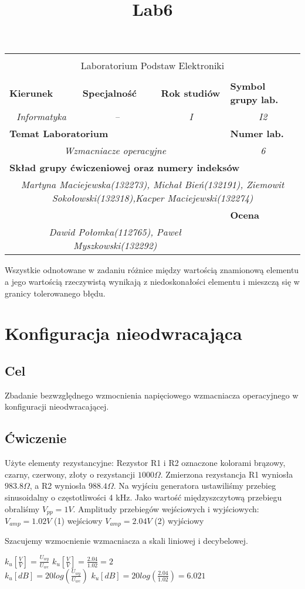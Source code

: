 \documentclass[polish,a4paper]{article}
\title{Lab6}
\newcommand{\PRzFieldDsc}[1]{\sffamily\bfseries\scriptsize #1}
\newcommand{\PRzFieldCnt}[1]{\textit{#1}}
\newcommand{\PRzHeading}[8]{
\begin{center}
\begin{tabular}{ p{0.32\textwidth} p{0.15\textwidth} p{0.15\textwidth} p{0.12\textwidth} p{0.12\textwidth} }

  &   &   &   &   \\
\hline
\multicolumn{5}{|c|}{}\\[-1ex]
\multicolumn{5}{|c|}{{\LARGE #1}}\\
\multicolumn{5}{|c|}{}\\[-1ex]

\hline
\multicolumn{1}{|l|}{\PRzFieldDsc{Kierunek}}	& \multicolumn{1}{|l|}{\PRzFieldDsc{Specjalność}}	& \multicolumn{1}{|l|}{\PRzFieldDsc{Rok studiów}}	& \multicolumn{2}{|l|}{\PRzFieldDsc{Symbol grupy lab.}} \\
\multicolumn{1}{|c|}{\PRzFieldCnt{#2}}		& \multicolumn{1}{|c|}{\PRzFieldCnt{#3}}		& \multicolumn{1}{|c|}{\PRzFieldCnt{#4}}		& \multicolumn{2}{|c|}{\PRzFieldCnt{#5}} \\

\hline
\multicolumn{4}{|l|}{\PRzFieldDsc{Temat Laboratorium}}		& \multicolumn{1}{|l|}{\PRzFieldDsc{Numer lab.}} \\
\multicolumn{4}{|c|}{\PRzFieldCnt{#6}}				& \multicolumn{1}{|c|}{\PRzFieldCnt{#7}} \\

\hline
\multicolumn{5}{|l|}{\PRzFieldDsc{Skład grupy ćwiczeniowej oraz numery indeksów}}\\
\multicolumn{5}{|c|}{\PRzFieldCnt{#8}}\\

\hline
\multicolumn{3}{|l|}{\PRzFieldDsc{}}	& \multicolumn{2}{|l|}{\PRzFieldDsc{Ocena}} \\
\multicolumn{3}{|c|}{\PRzFieldCnt{Dawid Połomka(112765), Paweł Myszkowski(132292) }}		& \multicolumn{2}{|c|}{\PRzFieldCnt{\ }} \\

\hline
\end{tabular}
\end{center}
}
\begin{document}
\PRzHeading{Laboratorium Podstaw Elektroniki}{Informatyka}{--}{I}{I2}{Wzmacniacze operacyjne}{6}{Martyna Maciejewska(132273), Michał Bień(132191), Ziemowit Sokołowski(132318),Kacper Maciejewski(132274)}{}

{\large Wszystkie odnotowane w zadaniu różnice między wartością znamionową elementu a jego wartością rzeczywistą wynikają z niedoskonałości elementu i mieszczą się w granicy tolerowanego błędu.}

\section{Konfiguracja nieodwracająca}

\subsection{Cel}
Zbadanie bezwzględnego wzmocnienia napięciowego wzmacniacza operacyjnego w konfiguracji nieodwracającej.

\subsection{Ćwiczenie}

Użyte elementy rezystancyjne: 
Rezystor R1 i R2 oznaczone kolorami brązowy, czarny, czerwony, złoty o rezystancji $1000\Omega$. Zmierzona rezystancja R1 wyniosła $983.8\Omega$, a R2 wyniosła $988.4\Omega$.
Na wyjściu generatora ustawiliśmy przebieg sinusoidalny o częstotliwości 4 kHz. Jako wartość międzyszczytową przebiegu obraliśmy $V_{pp}=1V$.
\newline
\newline
Amplitudy przebiegów wejściowych i wyjściowych:\newline
$V_{amp} = 1.02V$ \hspace{2cm} (1) wejściowy \newline
$V_{amp} = 2.04V$ \hspace{2cm} (2) wyjściowy \newline

Szacujemy wzmocnienie wzmacniacza a skali liniowej i decybelowej. 

\begin{center}
$k_u[\frac{V}{V}]=\frac{U_{wy}}{U_{we}}$ \hspace{2cm}  $k_u[\frac{V}{V}]=\frac{2.04}{1.02}=2$\\
$k_u[dB]=20log(\frac{U_{wy}}{U_{we}})$ \hspace{1.5cm} $k_u[dB]=20log(\frac{2.04}{1.02})=6.021$\\
\end{center}
\end{document}
